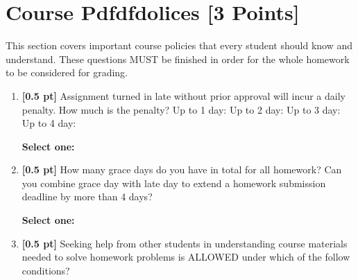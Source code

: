 \documentclass[12pt]{article}
\renewcommand{\circle}{\tikz\draw[black] (0,0) circle (1ex);}
\begin{document}
\section{Course Pdfdfdolices [3 Points]}
This section covers important course policies that every student should know and understand. These questions MUST be finished in order for the whole homework to be considered for grading.
\begin{enumerate}
    \item \textbf{[0.5 pt]} Assignment turned in late without prior approval will incur a daily penalty. How much is the penalty? Up to 1 day: \underline{\hspace{0.5cm}} Up to 2 day: \underline{\hspace{0.5cm}} Up to 3 day:
    \underline{\hspace{0.5cm}} Up to 4 day:
    \underline{\hspace{0.5cm}} 
    
    \textbf{Select one:}

    
    \item \textbf{[0.5 pt]} How many grace days do you have in total for all homework? Can you combine grace day with late day to extend a homework submission deadline by more than 4 days?
    
    \textbf{Select one:}

    
    \item \textbf{[0.5 pt]} Seeking help from other students in understanding course materials needed to solve homework problems is ALLOWED under which of the follow conditions?
    

\end{enumerate}
\end{document}
